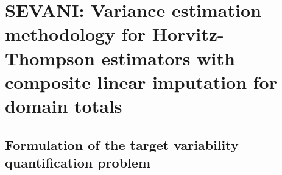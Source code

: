 

\section{SEVANI: Variance estimation methodology \cite{Beaumont2011} for {\color{red}Horvitz-Thompson} estimators with composite linear imputation for {\color{red}domain totals}}
\label{DomainTotalSEVANI}


\subsection{Formulation of the target variability quantification problem}
\label{DomainTotalFormulationOfVarianceEstimationProblem}
\setcounter{theorem}{0}


